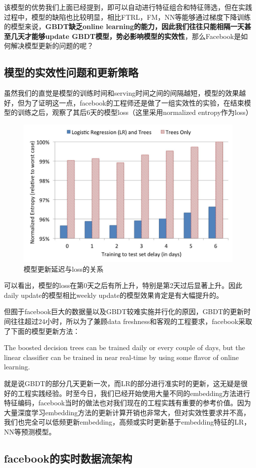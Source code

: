 \documentclass[12pt]{article}
\begin{document}
该模型的优势我们上面已经提到，即可以自动进行特征组合和特征筛选，但在实践过程中，模型的缺陷也比较明显，相比FTRL，FM，NN等能够通过梯度下降训练的模型来说，\textbf{GBDT缺乏online learning的能力，因此我们往往只能相隔一天甚至几天才能够update GBDT模型，势必影响模型的实效性}，那么Facebook是如何解决模型更新的问题的呢？

\subsection{模型的实效性问题和更新策略}
虽然我们的直觉是模型的训练时间和serving时间之间的间隔越短，模型的效果越好，但为了证明这一点，facebook的工程师还是做了一组实效性的实验，在结束模型的训练之后，观察了其后6天的模型loss（这里采用normalized entropy作为loss）
\begin{figure}[H]
    \centering
    \includegraphics[width=.6\textwidth]{fig/Facebook_GTDT_LR_Training_Delay.jpg}
    \caption{模型更新延迟与loss的关系}
\end{figure}

可以看出，模型的loss在第0天之后有所上升，特别是第2天过后显著上升。因此daily update的模型相比weekly update的模型效果肯定是有大幅提升的。

但囿于facebook巨大的数据量以及GBDT较难实施并行化的原因，GBDT的更新时间往往超过24小时，所以为了兼顾data freshness和客观的工程要求，facebook采取了下面的模型更新方法：

The boosted decision trees can be trained daily or every couple of days, but the linear classifier can be trained in near real-time by using some flavor of online learning.

就是说GBDT的部分几天更新一次，而LR的部分进行准实时的更新，这无疑是很好的工程实践经验。时至今日，我们已经开始使用大量不同的embedding方法进行特征编码，facebook当时的做法也对我们现在的工程实践有重要的参考价值。因为大量深度学习embedding方法的更新计算开销也非常大，但对实效性要求并不高，我们也完全可以低频更新embedding，高频或实时更新基于embedding特征的LR，NN等预测模型。

\subsection{facebook的实时数据流架构}
\end{document}
